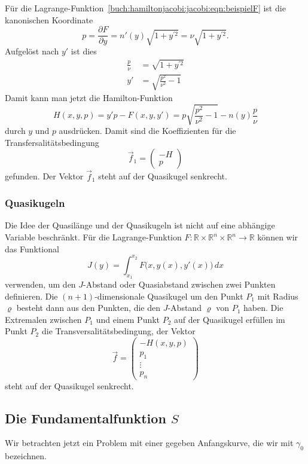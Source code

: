 \begin{beispiel}
\label{buch:hamiltonjacobi:jacobi:bsp:beispielFH}
Für die Lagrange-Funktion~\eqref{buch:hamiltonjacobi:jacobi:eqn:beispielF}
ist die kanonischen Koordinate
\[
p
=
\frac{\partial F}{\partial y}
=
n'(y)\sqrt{1+y^{\prime 2}}
=
\nu \sqrt{1+y^{\prime 2}}.
\]
Aufgelöst nach $y'$ ist dies
\begin{align*}
\frac{p}{\nu}
&=
\sqrt{1+y^{\prime 2}}
\\
y'
&=
\sqrt{ \frac{p^2}{\nu^2} -1 }
\end{align*}
Damit kann man jetzt die Hamilton-Funktion
\[
H(x,y,p)
=
y'p - F(x,y,y')
=
p\sqrt{\frac{p^2}{\nu^2}-1}
-
n(y) \frac{p}{\nu}
\]
durch $y$ und $p$ ausdrücken.
Damit sind die Koeffizienten für die Transfersalitätsbedingung
\[
\vec{f}_1
=
\begin{pmatrix} 
-H\\
p
\end{pmatrix}
\]
gefunden.
Der Vektor $\vec{f}_1$ steht auf der Quasikugel senkrecht.
\end{beispiel}

%
%
\subsubsection{Quasikugeln}
Die Idee der Quasilänge und der Quasikugeln ist nicht auf eine abhängige
Variable beschränkt.
Für die Lagrange-Funktion 
$F\colon \mathbb{R}\times\mathbb{R}^n\times\mathbb{R}^n\to\mathbb{R}$
können wir das Funktional
\[
J(y) = \int_{x_1}^{x_2} F\bigl(x,y(x),y'(x)\bigr)\,dx
\]
verwenden, um den $J$-Abstand oder Quasiabstand zwischen zwei Punkten
definieren.
Die $(n+1)$-dimensionale Quasikugel um den Punkt $P_1$ mit Radius $\varrho$
besteht dann aus den Punkten, die den $J$-Abstand $\varrho$ von $P_1$ haben.
Die Extremalen zwischen $P_1$ und einem Punkt $P_2$ auf der Quasikugel
erfüllen im Punkt $P_2$ die Transversalitätsbedingung, der Vektor
\[
\vec{f}
=
\begin{pmatrix}
-H(x,y,p)\\
p_1\\
\vdots\\
p_n
\end{pmatrix}
\]
steht auf der Quasikugel senkrecht.

%
%
\subsection{Die Fundamentalfunktion $S$}
Wir betrachten jetzt ein Problem mit einer gegeben Anfangskurve,
die wir mit $\gamma_0$ bezeichnen.

